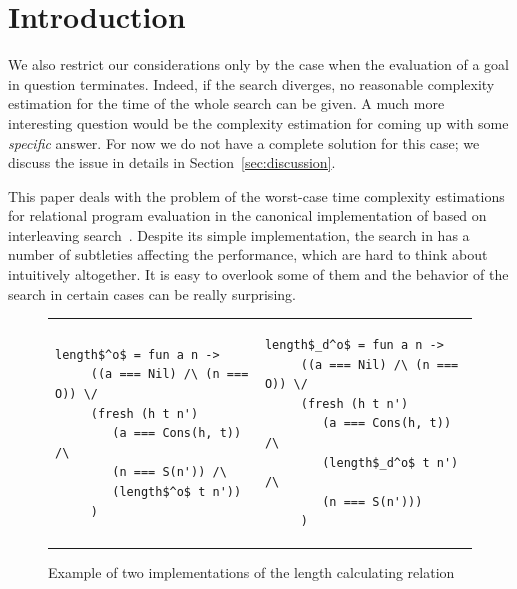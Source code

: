 \section{Introduction}
\label{sec:intro}

{\color{red}

We also restrict our considerations only by the case when the evaluation of a goal in question terminates. Indeed,
if the search diverges, no reasonable complexity estimation for the time of the whole search can be given. A much more interesting question would be
the complexity estimation for coming up with some \emph{specific} answer. For now we do not have a complete solution for this case; we discuss the issue in details in Section~\ref{sec:discussion}.
}

This paper deals with the problem of the worst-case time complexity estimations for relational program evaluation in the canonical implementation of \mK based on interleaving search~\cite{TRS}. Despite its simple implementation, the search in \mK has a number of subtleties
affecting the performance, which are hard to think about intuitively altogether. It is easy to overlook some of them and the behavior of the search in certain cases can be really surprising.

\begin{figure}[t]
\begin{tabular}{p{5cm}p{5cm}}
\begin{lstlisting}[basicstyle=\small]
   length$^o$ = fun a n ->
     ((a === Nil) /\ (n === O)) \/
     (fresh (h t n')
        (a === Cons(h, t)) /\
        (n === S(n')) /\
        (length$^o$ t n'))
     )
\end{lstlisting} &
\begin{lstlisting}[basicstyle=\small]
   length$_d^o$ = fun a n ->
     ((a === Nil) /\ (n === O)) \/
     (fresh (h t n')
        (a === Cons(h, t)) /\
        (length$_d^o$ t n') /\
        (n === S(n')))
     )
\end{lstlisting}
\end{tabular}
\caption{Example of two implementations of the length calculating relation}
\label{fig:length_implementations}
\end{figure}

